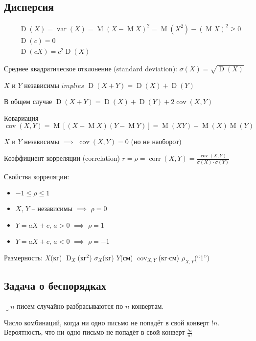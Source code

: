 \documentclass[a4paper,12pt,fleqn]{article}
\numberwithin{figure}{section}
\theoremstyle{definition}
\let\leqs\leqslant
\let\geqs\geqslant
\DeclareMathOperator{\var}{var}
\DeclareMathOperator{\cov}{cov}
\DeclareMathOperator{\corr}{corr}
\DeclareMathOperator{\M}{M}
\DeclareMathOperator{\D}{D}
\def\lets{{\huge$\lrcorner$}\space}
\begin{document}
\subsection{Дисперсия}

\begin{align*}
&	\D(X) = \var(X) = \M(X-\M X)^2 = \M(X^2) - (\M X)^2 \geqs 0 \\
&	\D(c) = 0 \\
&	\D(cX) = c^2\D(X)
\end{align*}

Среднее квадратическое отклонение (standard deviation):
$\sigma(X) = \sqrt{\D(X)}$

$X$ и $Y$ независимы $implies$ $\D(X+Y) = \D(X) + \D(Y)$

В общем случае  $\D(X+Y) = \D(X) + \D(Y) + 2\cov(X,Y)$

Ковариация  $\cov(X,Y) = \M[(X-\M X)(Y-\M Y)] = \M(XY)-\M(X)\M(Y)$

$X$ и $Y$ независимы $\implies$ $\cov(X,Y)=0$ (но не наоборот)

Коэффициент корреляции (correlation)
$r = \rho = \corr(X,Y) = \frac{\cov(X,Y)}{\sigma(X) \cdot \sigma(Y)} $

Свойства корреляции:
\begin{itemize}
	\item $-1 \leqs \rho \leqs 1$
	\item $X$, $Y$ -- независимы $\implies$ $\rho=0$
	\item $Y=aX+c$, $a>0$ $\implies$ $\rho=1$
	\item $Y=aX+c$, $a<0$ $\implies$ $\rho=-1$
\end{itemize}

Размерность:
$X$(кг) $\D_X$(кг${}^2$) $\sigma_X$(кг)
$Y$(см) $\cov_{X,Y}$(кг$\cdot$см) $\rho_{X,Y}$(``1'')


\subsection{Задача о беспорядках}

\lets $n$ писем случайно разбрасываются по $n$ конвертам.

Число комбинаций, когда ни одно письмо не попадёт в свой конверт $!n$. \\
Вероятность, что ни одно письмо не попадёт в свой конверт $\frac{!n}{n!}$
\end{document}
